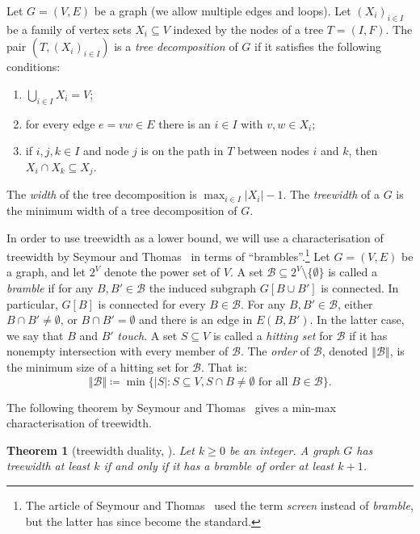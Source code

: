 \documentclass[10pt]{amsart}
\newtheorem{theorem}{Theorem}[section]
\newcommand*{\B}{\mathcal{B}}
\newcommand*{\order}[1]{\left\Vert#1\right\Vert}
\begin{document}
Let $G=(V,E)$ be a graph (we allow multiple edges and loops). Let $(X_i)_{i\in I}$ be a family of vertex sets $X_i\subseteq V$ indexed by the nodes of a tree $T=(I,F)$. The pair $(T,(X_i)_{i\in I})$ is a \emph{tree decomposition} of $G$ if it satisfies the following conditions: 
\begin{enumerate}[label=(\roman*)]
 \item $\bigcup_{i\in I} X_i = V$;
 \item for every edge $e=vw\in E$ there is an $i\in I$ with $v,w\in X_i$;
 \item if $i,j,k\in I$ and node $j$ is on the path in $T$ between nodes $i$ and $k$, then $X_i\cap X_k\subseteq X_j$.
\end{enumerate}
The \emph{width} of the tree decomposition is $\max_{i\in I} |X_i|-1$. The \emph{treewidth} of a $G$ is the minimum width of a tree decomposition of $G$. 


In order to use treewidth as a lower bound, we will use a characterisation of treewidth by Seymour and Thomas~\cite{SeymourThomas1993} in terms of ``brambles''.\footnote{The article of Seymour and Thomas~\cite{SeymourThomas1993} used the term \emph{screen} instead of \emph{bramble}, but the latter has since become the standard.} Let $G=(V,E)$ be a graph, and let $2^V$ denote the power set of $V$. A set $\B\subseteq 2^V\setminus\{\emptyset\}$ is called a \emph{bramble} if for any $B,B'\in \B$ the induced subgraph $G[B\cup B']$ is connected. In particular, $G[B]$ is connected for every $B\in \B$. For any $B,B'\in \B$, either $B\cap B'\neq \emptyset$, or $B\cap B'=\emptyset$ and there is an edge in $E(B,B')$. In the latter case, we say that $B$ and $B'$ \emph{touch}.
A set $S\subseteq V$ is called a \emph{hitting set} for $\B$ if it has nonempty intersection with every member of $\B$. The \emph{order} of $\B$, denoted $\order{\B}$, is the minimum size of a hitting set for $\B$. That is:
\begin{equation}
\order{\B}\coloneqq \min \{|S| : S\subseteq V, S\cap B\neq\emptyset \text{ for all $B\in \B$}\}.
\end{equation}

The following theorem by Seymour and Thomas~\cite{SeymourThomas1993} gives a min-max characterisation of treewidth.

\begin{theorem}[{treewidth duality, \cite[Theorem~1.4]{SeymourThomas1993}}]
Let $k\geq 0$ be an integer. A graph $G$ has treewidth at least $k$ if and only if it has a bramble of order at least $k + 1$.
\end{theorem} 
\end{document}

